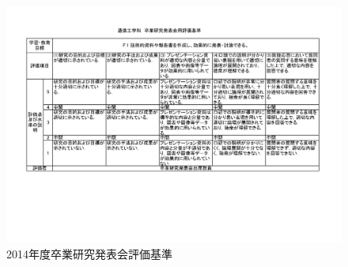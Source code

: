 \documentclass[a4j,12pt,dvipdfmx,oneside]{jsbook}
\theoremstyle{definition}
\begin{document}
\begin{figure}[htbp]
\includegraphics[width=\linewidth]{presenLevel.pdf}
\caption{2014年度卒業研究発表会評価基準}
\label{fig:presenLevel}
\end{figure}
\end{document}
